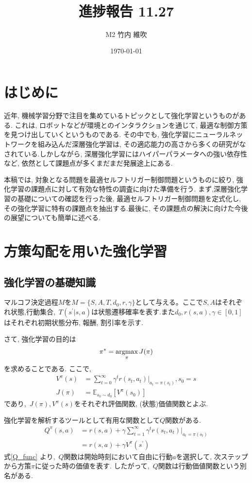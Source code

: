 \documentclass{jsarticle}
\title{\large{\bf{進捗報告 11.27}}}
\author{M2 竹内 維吹}
\date{\today}
\newcommand{\argmax}{\mathop{\rm argmax}\limits}
\newcommand{\expect}{\mathbb{E}}
\begin{document}
\maketitle


\section{はじめに}
近年, 機械学習分野で注目を集めているトピックとして強化学習というものがある. これは, ロボットなどが環境とのインタラクションを通じて, 最適な制御方策を見つけ出していくというものである. その中でも, 強化学習にニューラルネットワークを組み込んだ深層強化学習は, その適応能力の高さから多くの研究がなされている.しかしながら, 深層強化学習にはハイパーパラメータへの強い依存性など, 依然として課題点が多くまだまだ発展途上にある.\par
本稿では, 対象となる問題を最適セルフトリガー制御問題というものに絞り, 強化学習の課題点に対して有効な特性の調査に向けた準備を行う. まず,深層強化学習の基礎についての確認を行った後, 最適セルフトリガー制御問題を定式化し, その強化学習に特有の課題点を抽出する.最後に, その課題点の解決に向けた今後の展望についても簡単に述べる.

\section{方策勾配を用いた強化学習}
\subsection{強化学習の基礎知識}
マルコフ決定過程$M$を$M=\{S,A,T,d_0,r,\gamma\}$として与える。ここで$S,A$はそれぞれ状態,行動集合,~$T(s^{'}|s,a)$は状態遷移確率を表す.また$d_0,r(s,a),\gamma\in[0,1]$はそれぞれ初期状態分布, 報酬, 割引率を示す.\par
さて, 強化学習の目的は
\begin{equation}
	\pi^{*}=\argmax_{\pi}J(\pi) \label{purpose_of_rl}
\end{equation}を求めることである. ここで, 
\begin{align}
	V^{\pi}(s) &= \sum_{t=0}^{\infty}\gamma^tr(s_t, a_t)|_{a_t=\pi(s_t)}, s_0 = s\label{value_function}\\
	J(\pi) &= \expect_{s_0\sim d_0}[V^{\pi}(s_0)]
\end{align}
であり,~$J(\pi), V^{\pi}(s)$をそれぞれ評価関数, (状態)価値関数とよぶ.\par
強化学習を解析するツールとして有用な関数として$Q$関数がある.
\begin{align}
	Q^{\pi}(s,a) &= r(s, a) + \gamma\sum_{t=1}^{\infty}\gamma^tr(s_t, a_t)|_{a_t=\pi(s_t)} \nonumber\\
			    &= r(s, a) + \gamma V^{\pi}(s^{\prime}) \label{Q_func}
\end{align}
式\eqref{Q_func} より,~$Q$関数は開始時刻において自由に行動$a$を選択して, 次ステップから方策$\pi$に従った時の価値を表す. したがって,~$Q$関数は行動価値関数という別名がある.
\end{document}

